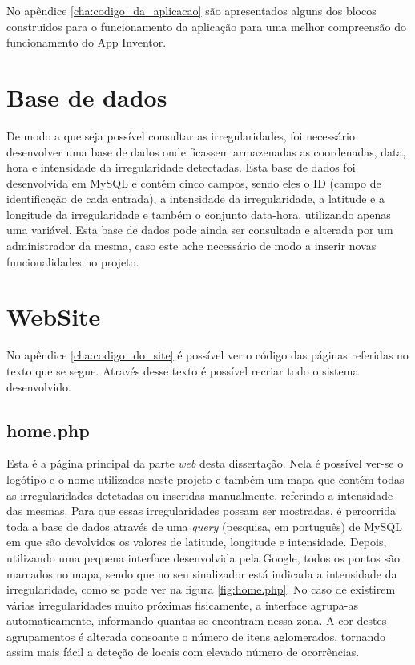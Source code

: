 No apêndice \ref{cha:codigo_da_aplicacao} são apresentados alguns dos blocos construidos para o funcionamento da aplicação para uma melhor compreensão do funcionamento do App Inventor.
\newpage

\section{Base de dados}
\label{sec:Base_de_dados}

De modo a que seja possível consultar as irregularidades, foi necessário desenvolver uma base de dados onde ficassem armazenadas as coordenadas, data, hora e intensidade da irregularidade detectadas.
Esta base de dados foi desenvolvida em MySQL e contém cinco campos, sendo eles o ID (campo de identificação de cada entrada), a intensidade da irregularidade, a latitude e a longitude da irregularidade e também o conjunto data-hora, utilizando apenas uma variável.
Esta base de dados pode ainda ser consultada e alterada por um administrador da mesma, caso este ache necessário de modo a inserir novas funcionalidades no projeto.

\section{WebSite}
\label{sec:website}

No apêndice \ref{cha:codigo_do_site} é possível ver o código das páginas referidas no texto que se segue.
Através desse texto é possível recriar todo o sistema desenvolvido.

\subsection{home.php}
\label{sub:home.php}

Esta é a página principal da parte \emph{web} desta dissertação.
Nela é possível ver-se o logótipo e o nome utilizados neste projeto e também um mapa que contém todas as irregularidades detetadas ou inseridas manualmente, referindo a intensidade das mesmas.
Para que essas irregularidades possam ser mostradas, é percorrida toda a base de dados através de uma \emph{query} (pesquisa, em português) de MySQL em que são devolvidos os valores de latitude, longitude e intensidade.
Depois, utilizando uma pequena interface desenvolvida pela Google, todos os pontos são marcados no mapa, sendo que no seu sinalizador está indicada a intensidade da irregularidade, como se pode ver na figura \ref{fig:home.php}.
No caso de existirem várias irregularidades muito próximas fisicamente, a interface agrupa-as automaticamente, informando quantas se encontram nessa zona.
A cor destes agrupamentos é alterada consoante o número de itens aglomerados, tornando assim mais fácil a deteção de locais com elevado número de ocorrências.

